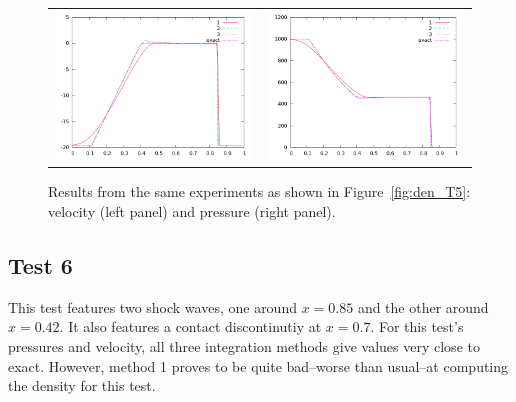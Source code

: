 \documentclass[10pt]{article}
\begin{document}
\begin{figure}
  \begin{center}
	\begin{tabular}{cc}
      \includegraphics[width=.475\textwidth]{vel_T5.png} &
	  \includegraphics[width=.475\textwidth]{prs_T5.png}
	\end{tabular}
  \end{center}
  \caption{Results from the same experiments as shown in Figure~\ref{fig:den_T5}:
  velocity (left panel) and pressure (right panel).}
\end{figure}
\clearpage

\subsection{Test 6}
This test features two shock waves, one around $x=0.85$ and the other around $x=0.42$. It also features a contact discontinutiy at $x=0.7$.
For this test's pressures and velocity, all three integration methods give values very close to exact. However, method 1 proves to be quite bad--worse than usual--at computing the density for this test. 
\end{document}
